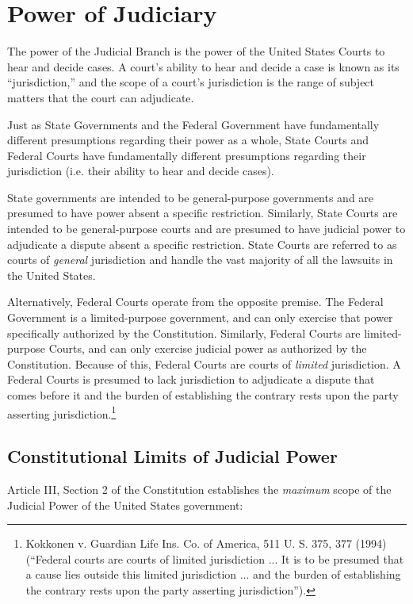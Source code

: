 \section{Power of Judiciary}

The power of the Judicial Branch is the power of the United States Courts to hear and decide cases.  A court's ability to hear and decide a case is known as its ``jurisdiction,'' and the scope of a court's jurisdiction is the range of subject matters that the court can adjudicate.  


Just as State Governments and the Federal Government have fundamentally different presumptions regarding their power as a whole, State Courts and Federal Courts have fundamentally different presumptions regarding their jurisdiction (i.e. their ability to hear and decide cases).  

State governments are intended to be general-purpose governments and are presumed to have power absent a specific restriction.  Similarly, State Courts are intended to be general-purpose courts and are presumed to have judicial power to adjudicate a dispute absent a specific restriction.
State Courts are referred to as courts of \textit{general} jurisdiction and handle the vast majority of all the lawsuits in the United States.

Alternatively, Federal Courts operate from the opposite premise.  The Federal Government is a limited-purpose government, and can only exercise that power specifically authorized by the Constitution.  Similarly, Federal Courts are limited-purpose Courts, and can only exercise judicial power as authorized by the Constitution.  Because of this, Federal Courts are courts of \textit{limited} jurisdiction.  A Federal Courts is presumed to lack jurisdiction to adjudicate a dispute that comes before it and the burden of establishing the contrary rests upon the party asserting jurisdiction.\footnote{Kokkonen v. Guardian Life Ins. Co. of America, 511 U. S. 375, 377 (1994)(``Federal courts are courts of limited jurisdiction ... It is to be presumed that a cause lies outside this limited jurisdiction ... and the burden of establishing the contrary rests upon the party asserting jurisdiction'').}



\subsection{Constitutional Limits of Judicial Power}
Article III, Section 2 of the Constitution establishes the \textit{maximum} scope of the Judicial Power of the United States government:

